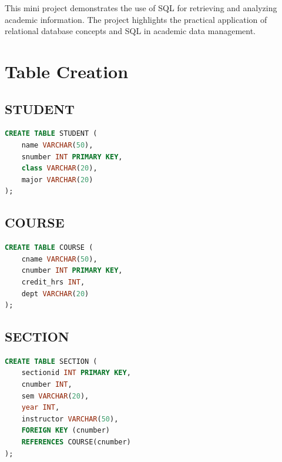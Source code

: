 \documentclass[12pt,a4paper]{report}
\begin{document}
\vspace{0.2cm}

\noindent
This mini project demonstrates the use of SQL for retrieving and analyzing academic information. The project highlights the practical application of relational database concepts and SQL in academic data management.


\newpage


\vspace{-1.0cm}

\section*{Table Creation}

\subsection*{STUDENT}
\begin{lstlisting}[language=SQL]
CREATE TABLE STUDENT (
    name VARCHAR(50),
    snumber INT PRIMARY KEY,
    class VARCHAR(20),
    major VARCHAR(20)
);
\end{lstlisting}

\subsection*{COURSE}
\begin{lstlisting}[language=SQL]
CREATE TABLE COURSE (
    cname VARCHAR(50),
    cnumber INT PRIMARY KEY,
    credit_hrs INT,
    dept VARCHAR(20)
);
\end{lstlisting}

\subsection*{SECTION}
\begin{lstlisting}[language=SQL]
CREATE TABLE SECTION (
    sectionid INT PRIMARY KEY,
    cnumber INT,
    sem VARCHAR(20),
    year INT,
    instructor VARCHAR(50),
    FOREIGN KEY (cnumber)
    REFERENCES COURSE(cnumber)
);
\end{lstlisting}
\end{document}
